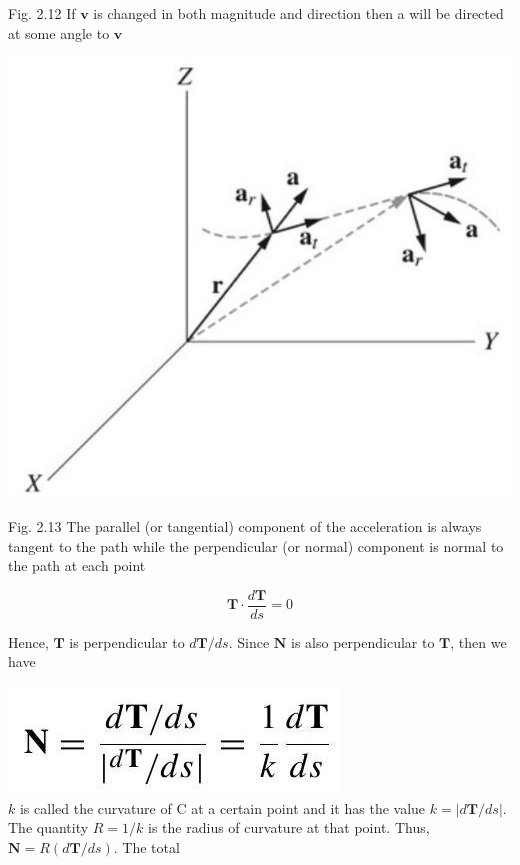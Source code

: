 \documentclass[10pt]{article}
\begin{document}
Fig. 2.12 If $\mathbf{v}$ is changed in both magnitude and direction then a will be directed at some angle to $\mathbf{v}$

\begin{center}
\includegraphics[max width=\textwidth]{2024_09_13_db1f357d2aad0a03eb2eg-032(1)}
\end{center}

Fig. 2.13 The parallel (or tangential) component of the acceleration is always tangent to the path while the perpendicular (or normal) component is normal to the path at each point

$$
\mathbf{T} \cdot \frac{d \mathbf{T}}{d s}=0
$$

Hence, $\mathbf{T}$ is perpendicular to $d \mathbf{T} / d s$. Since $\mathbf{N}$ is also perpendicular to $\mathbf{T}$, then we have

\includegraphics[max width=\textwidth, center]{2024_09_13_db1f357d2aad0a03eb2eg-032}\\
$k$ is called the curvature of C at a certain point and it has the value $k=|d \mathbf{T} / d s|$. The quantity $R=1 / k$ is the radius of curvature at that point. Thus, $\mathbf{N}=R(d \mathbf{T} / d s)$. The total
\end{document}
